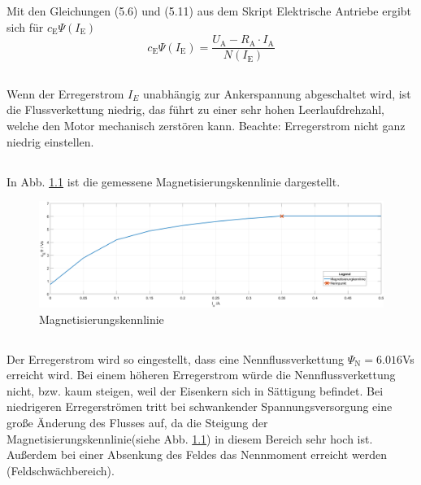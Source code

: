 \chapter{}\label{ex:aufg4}
%
\section{}\label{sec:aufg4a}
Mit den Gleichungen (5.6) und (5.11) aus dem Skript Elektrische Antriebe ergibt sich für $c_\text{E}\Psi(I_\text{E})$
\begin{equation}
c_\text{E}\Psi(I_\text{E}) = \frac{U_\text{A} - R_\text{A} \cdot I_\text{A}}{N(I_\text{E})}
\end{equation}
\section{}\label{sec:aufg4b}
Wenn der Erregerstrom $I_E$ unabhängig zur Ankerspannung abgeschaltet wird, ist die Flussverkettung niedrig, das führt zu einer sehr hohen Leerlaufdrehzahl, welche den Motor mechanisch zerstören kann.
Beachte: Erregerstrom nicht ganz niedrig einstellen. 

\section{}\label{sec:aufg4c}
%
In Abb. \ref{fig:magnet} ist die gemessene Magnetisierungskennlinie dargestellt.
\begin{figure}[htb]

\includegraphics[width=1\textwidth]{./Bilder/magentisierungkennlinie_1}
\caption{Magnetisierungskennlinie}
\label{fig:magnet}
\end{figure}
%
\section{}\label{sec:aufg4_d}
%
Der Erregerstrom wird so eingestellt, dass eine Nennflussverkettung $\Psi_\text{N} = 6.016$Vs erreicht wird. Bei einem höheren Erregerstrom würde die Nennflussverkettung nicht, bzw. kaum steigen, weil der Eisenkern sich in Sättigung befindet. Bei niedrigeren Erregerströmen tritt bei schwankender Spannungsversorgung eine große Änderung des Flusses auf, da die Steigung der Magnetisierungskennlinie(siehe Abb. \ref{fig:magnet}) in diesem Bereich sehr hoch ist. Außerdem bei einer Absenkung des Feldes das Nennmoment erreicht werden (Feldschwächbereich).
%
\clearpage